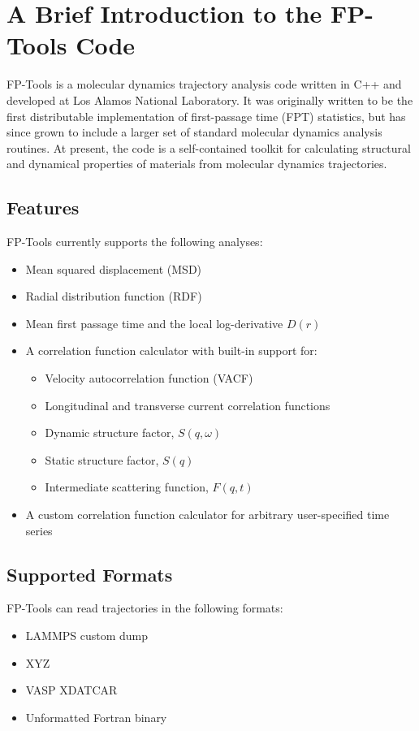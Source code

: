 \newpage
\section{A Brief Introduction to the FP-Tools Code}

FP-Tools is a molecular dynamics trajectory analysis code written in C++ and 
developed at Los Alamos National Laboratory. It was originally written to be
the first distributable implementation of first-passage time (FPT) statistics,
but has since grown to include a larger set of standard molecular dynamics
analysis routines. At present, the code is a self-contained toolkit for 
calculating structural and dynamical properties of materials from molecular 
dynamics trajectories.

\subsection{Features}

FP-Tools currently supports the following analyses:
\begin{itemize}
    \item Mean squared displacement (MSD)
    \item Radial distribution function (RDF)
    \item Mean first passage time and the local log-derivative $D(r)$
    \item A correlation function calculator with built-in support for:
        \begin{itemize}
            \item Velocity autocorrelation function (VACF)
            \item Longitudinal and transverse current correlation functions
            \item Dynamic structure factor, $S(q, \omega)$
            \item Static structure factor, $S(q)$
            \item Intermediate scattering function, $F(q, t)$
        \end{itemize}
    \item A custom correlation function calculator for arbitrary user-specified
    time series
\end{itemize}

\subsection{Supported Formats}

FP-Tools can read trajectories in the following formats:
\begin{itemize}
    \item LAMMPS custom dump
    \item XYZ
    \item VASP XDATCAR
    \item Unformatted Fortran binary
\end{itemize}

